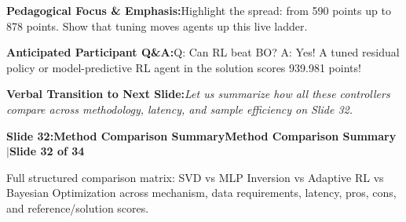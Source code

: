 \documentclass[11pt,a4paper]{article}
\begin{document}
\begin{tcolorbox}[colback=lightbg,colframe=bordergray,left=6pt,right=6pt,top=3pt,bottom=3pt,boxrule=0.6pt,arc=2.5pt]
\small
\noindent\textbf{\color{navy}Pedagogical Focus \& Emphasis:}\enspace Highlight the spread: from 590 points up to 878 points. Show that tuning moves agents up this live ladder.\par\vspace{0.3em}
\noindent\textbf{\color{successgreen}Anticipated Participant Q\&A:}\enspace Q: Can RL beat BO? A: Yes! A tuned residual policy or model-predictive RL agent in the solution scores 939.981 points!\par\vspace{0.3em}
\noindent\textbf{\color{accent}Verbal Transition to Next Slide:}\enspace \emph{Let us summarize how all these controllers compare across methodology, latency, and sample efficiency on Slide 32.}
\end{tcolorbox}
\clearpage
\hypertarget{slide.32}{}
{}
\noindent\begin{tcolorbox}[colback=navy,colframe=navy,left=6pt,right=6pt,top=3pt,bottom=3pt,boxrule=0pt,arc=2pt]
{\large\bfseries\color{white}Slide 32:\enspace Method Comparison Summary}\hfill{\footnotesize\bfseries\color{white!85!lightbg}Method Comparison Summary \enspace$|$\enspace Slide 32 of 34}
\end{tcolorbox}
\vspace{0.2em}
\begin{tcolorbox}[colback=lightbg,colframe=bordergray,title={\footnotesize\bfseries\color{darkgray}Slide Visual Blueprint},fontupper=\small,left=6pt,right=6pt,top=2.5pt,bottom=2.5pt,boxrule=0.6pt,arc=2.5pt]
Full structured comparison matrix: SVD vs MLP Inversion vs Adaptive RL vs Bayesian Optimization across mechanism, data requirements, latency, pros, cons, and reference/solution scores.
\end{tcolorbox}
\vspace{0.2em}
\end{document}
